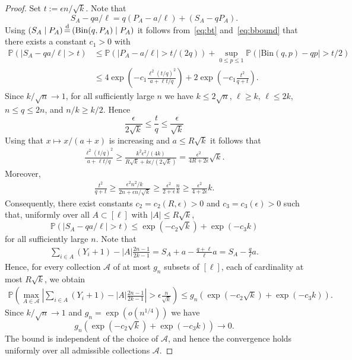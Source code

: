 \documentclass[english,11pt]{smfart}
\newcommand{\Prb}[1]{\mathbb{P}\left(#1\right)}
\newcommand{\eqdist}{\,{\buildrel \mathrm{d} \over =}\,}
\numberwithin{equation}{section}
\begin{document}
\begin{proof}
	Set $t := \epsilon n / \sqrt{k}$. Note that 
	\[
		S_A - qa/\ell =  q(P_A - a/\ell) + (S_A - q P_A) .
	\]
	Using $(S_A \mid P_A) \eqdist (\mathrm{Bin}(q, P_A) \mid P_A)$ it follows from~\eqref{eq:bt} and~\eqref{eq:bbound} that there exists a constant $c_1>0$ with
	\begin{align*}
		\Prb{|S_A - qa/\ell|>t} &\le \Prb{|P_A - a/\ell| > t/(2q)} + \sup_{0\le p \le 1} \Prb{|\mathrm{Bin}(q,p) - qp| > t/2}  \\ 
		&\le 4\exp\left(-c_1 \frac{\ell^2(t/q)^2}{a+\ell t/q}\right) + 2\exp\left(-c_1 \frac{t^2}{q+t}\right).
	\end{align*}
	Since $k / \sqrt{n} \to 1$, for all sufficiently large $n$ we have $k \le 2 \sqrt{n}$, $\ell \ge k$, $\ell \le 2k$, $n \le q \le 2n$, and $n/k \ge k/2$. Hence
	\[
		\frac{\epsilon}{2 \sqrt{k}} \le \frac{t}{q} \le \frac{\epsilon}{\sqrt{k}}
	\]
	Using that $x \mapsto x/(a+x)$ is increasing and $a \le R \sqrt{k}$ it follows that
	\begin{align*}
		\frac{\ell^2 (t/q)^2}{a + \ell t/q} \ge \frac{k^2 \epsilon^2/(4k)}{R \sqrt{k} + k \epsilon/(2\sqrt{k})} = \frac{\epsilon^2}{4R + 2\epsilon} \sqrt{k}.
	\end{align*}
	Moreover,
	\begin{align*}
		\frac{t^2}{q + t} \ge \frac{\epsilon^2 n^2 / k}{2n + \epsilon n/\sqrt{k}} \ge \frac{\epsilon^2}{2 + \epsilon} \frac{n}{k} \ge \frac{\epsilon^2}{4 + 2\epsilon} k.
	\end{align*}
	Consequently, there exist constants $c_2 = c_2(R,\epsilon) > 0$ and $c_3 = c_3(\epsilon) > 0$ such that, uniformly over all $A \subset [\ell]$ with $|A| \le R \sqrt{k}$,
	\[
		\Prb{|S_A - qa/\ell| > t} \le  \exp(-c_2 \sqrt{k}) + \exp(-c_3 k)
	\]
	for all sufficiently large $n$. Note that
	\begin{align*}
		\sum_{i \in A}(Y_i + 1) - |A| \frac{2n - 1}{2k - 1} = S_A + a - \frac{q + \ell}{\ell}a = S_A - \frac{q}{\ell}a.
	\end{align*}
	Hence, for every collection $\mathcal{A}$ of at most $g_n$ subsets of $[\ell]$, each of cardinality at most $R \sqrt{k}$, we obtain
	\begin{align*}
		\Prb{\max_{A \in \mathcal A} \left|\sum_{i \in A}(Y_i + 1) - |A| \frac{2n - 1}{2k - 1}\right| > \epsilon \frac{n}{\sqrt{k}}} \le  g_n \left( \exp(-c_2 \sqrt{k}) +  \exp(-c_3 k)\right).
	\end{align*}
	Since $k / \sqrt{n} \to 1$ and $g_n = \exp(o(n^{1/4}))$ we have
	\[
		g_n \left( \exp(-c_2 \sqrt{k}) +  \exp(-c_3 k)\right) \to 0.
	\]
	The bound is independent of the choice of $\mathcal A$, and hence the convergence holds uniformly over all admissible collections $\mathcal A$.
\end{proof}
\end{document}
